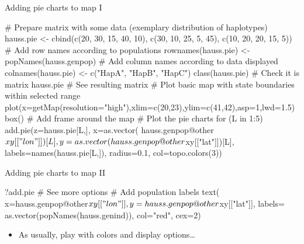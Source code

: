 \documentclass[compress, ucs, xelatex, 11pt, xcolor=svgnames, aspectratio=169,
	hyperref={
		bookmarks=true,
		unicode=true,
		colorlinks=true,
		pdftitle={Molecular data in R},
		plainpages=false,
		pdfauthor={Vojtech Zeisek},
		pdfsubject={Course about phylogeny and evolution in R},
		pdfcreator={XeLaTeX},
		pdfkeywords={R, evolution, phylogeny, molecular data},
		linkcolor=Crimson, %
		anchorcolor=Magenta, %
		citecolor=Magenta, %
		filecolor=Magenta, %
		menucolor=Magenta, %
		urlcolor=DodgerBlue, %
		pdftex},
	url={hyphens, lowtilde} %
	]{beamer}
\renewcommand{\texttt}[1]{\colorbox{Beige}{{\ttfamily #1}}}
\begin{document}
\begin{frame}[fragile]{Adding pie charts to map I}
	\begin{spluscode}
    # Prepare matrix with some data (exemplary distribution of haplotypes)
    hauss.pie <- cbind(c(20, 30, 15, 40, 10), c(30, 10, 25, 5, 45),
      c(10, 20, 20, 15, 5))
    # Add row names according to populations
    rownames(hauss.pie) <- popNames(hauss.genpop)
    # Add column names according to data displayed
    colnames(hauss.pie) <- c("HapA", "HapB", "HapC")
    class(hauss.pie) # Check it is matrix
    hauss.pie # See resulting matrix
    # Plot basic map with state boundaries within selected range
    plot(x=getMap(resolution="high"),xlim=c(20,23),ylim=c(41,42),asp=1,lwd=1.5)
    box() # Add frame around the map
    # Plot the pie charts
    for (L in 1:5) { add.pie(z=hauss.pie[L,], x=as.vector(
      hauss.genpop@other$xy[["lon"]])[L], y=as.vector(
      hauss.genpop@other$xy[["lat"]])[L], labels=names(hauss.pie[L,]),
      radius=0.1, col=topo.colors(3)) }
	\end{spluscode}
\end{frame}

\begin{frame}[fragile]{Adding pie charts to map II}
	\begin{multicols}{2}
		\begin{spluscode}
    ?add.pie # See more options
    # Add population labels
    text(
      x=hauss.genpop@other$xy[["lon"]],
      y=hauss.genpop@other$xy[["lat"]],
      labels=
      as.vector(popNames(hauss.genind)),
      col="red", cex=2)
		\end{spluscode}
		\begin{itemize}
			\item As usually, play with colors and display options\ldots
		\end{itemize}
		\begin{center}
			\texttt{[image: map\_pie.png]}
		\end{center}
	\end{multicols}
\end{frame}
\end{document}
